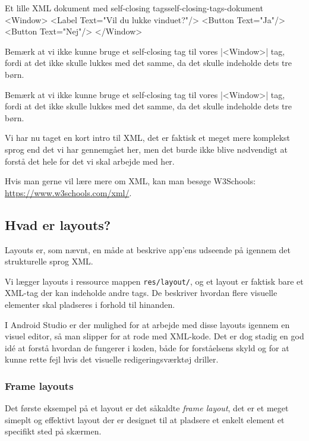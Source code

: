 \begin{example}
	\begin{XmlCode}{Et lille XML dokument med self-closing tags}{self-closing-tags-dokument}
		<Window>
			<Label Text="Vil du lukke vinduet?"/>
			<Button Text="Ja"/>
			<Button Text="Nej"/>
		</Window>
	\end{XmlCode}
\end{example}

\begin{remark}
	Bemærk at vi ikke kunne bruge et self-closing tag til vores \XmlInline|<Window>| tag, fordi at det ikke skulle lukkes med det samme, da det skulle indeholde dets tre børn.
\end{remark}

Bemærk at vi ikke kunne bruge et self-closing tag til vores \XmlInline|<Window>| tag, fordi at det ikke skulle lukkes med det samme, da det skulle indeholde dets tre børn.

Vi har nu taget en kort intro til XML, det er faktisk et meget mere komplekst sprog end det vi har gennemgået her, men det burde ikke blive nødvendigt at forstå det hele for det vi skal arbejde med her.

Hvis man gerne vil lære mere om XML, kan man besøge W3Schools: \url{https://www.w3schools.com/xml/}.


\subsection{Hvad er layouts?}
Layouts er, som nævnt, en måde at beskrive app'ens udseende på igennem det strukturelle sprog XML.

Vi lægger layouts i ressource mappen \texttt{res/layout/}, og et layout er 
faktisk bare et XML-tag der kan indeholde andre tags. De beskriver hvordan 
flere visuelle elementer skal pladseres i forhold til hinanden.

I Android Studio er der mulighed for at arbejde med disse layouts igennem en 
visuel editor, så man slipper for at rode med XML-kode. Det er dog stadig en 
god idé at forstå hvordan de fungerer i koden, både for forståelsens skyld og 
for at kunne rette fejl hvis det visuelle redigeringsværktøj driller.

\subsubsection{Frame layouts}

Det første eksempel på et layout er det såkaldte \textit{frame layout}, det er et meget simeplt og effektivt layout der er designet til at pladsere et enkelt element et specifikt sted på skærmen.

